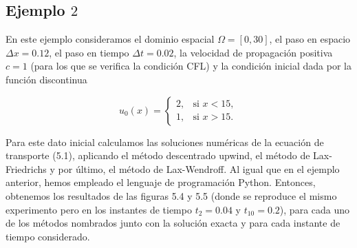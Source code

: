 \subsection*{Ejemplo $2$}

En este ejemplo consideramos el dominio espacial
$\Omega=\left[0,30\right]$, el paso en espacio $\Delta x=0.12$, el
paso en tiempo $\Delta t=0.02$, la velocidad de propagación positiva
$c=1$ (para los que se veriﬁca la condición CFL) y la condición
inicial dada por la función discontinua

\begin{equation*}
    u_{0}\left(x\right)=
    \begin{cases}
        2, & \text{si }x<15, \\
        1, & \text{si }x>15.
    \end{cases}
\end{equation*}

Para este dato inicial calculamos las soluciones numéricas de la
ecuación de transporte (5.1), aplicando el método descentrado upwind,
el método de Lax-Friedrichs y por último, el método de Lax-Wendroff.
Al igual que en el ejemplo anterior, hemos empleado el lenguaje de
programación Python.
Entonces, obtenemos los resultados de las ﬁguras 5.4 y 5.5 (donde se
reproduce el mismo experimento pero en los instantes de tiempo
$t_{2}=0.04$ y $t_{10}=0.2$), para cada uno de los métodos nombrados
junto con la solución exacta y para cada instante de tiempo
considerado.

